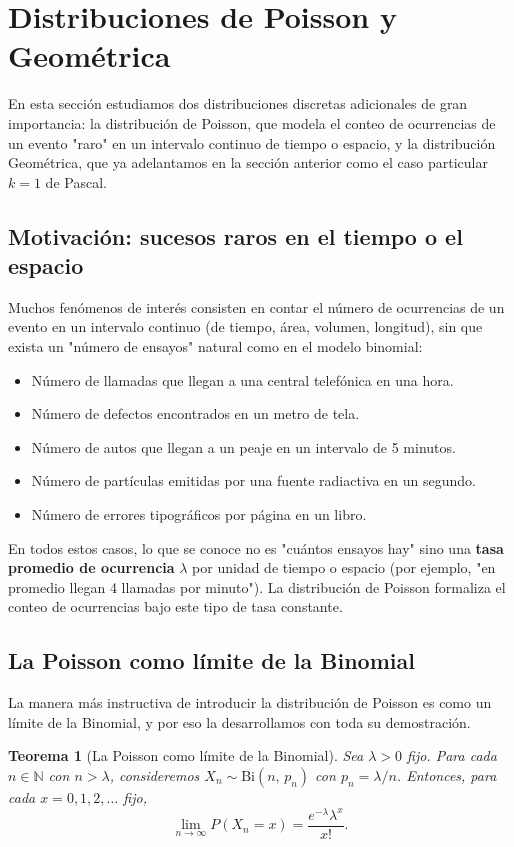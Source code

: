 \documentclass[11pt,a4paper]{article}
\theoremstyle{plain}
\newtheorem{teorema}{Teorema}[section]
\theoremstyle{definition}
\theoremstyle{remark}
\begin{document}
\newpage
\section{Distribuciones de Poisson y Geométrica}

En esta sección estudiamos dos distribuciones discretas adicionales de gran importancia: la distribución de Poisson, que modela el conteo de ocurrencias de un evento "raro" en un intervalo continuo de tiempo o espacio, y la distribución Geométrica, que ya adelantamos en la sección anterior como el caso particular $k=1$ de Pascal.

\subsection{Motivación: sucesos raros en el tiempo o el espacio}

Muchos fenómenos de interés consisten en contar el número de ocurrencias de un evento en un intervalo continuo (de tiempo, área, volumen, longitud), sin que exista un "número de ensayos" natural como en el modelo binomial:
\begin{itemize}
\item Número de llamadas que llegan a una central telefónica en una hora.
\item Número de defectos encontrados en un metro de tela.
\item Número de autos que llegan a un peaje en un intervalo de 5 minutos.
\item Número de partículas emitidas por una fuente radiactiva en un segundo.
\item Número de errores tipográficos por página en un libro.
\end{itemize}
En todos estos casos, lo que se conoce no es "cuántos ensayos hay" sino una \textbf{tasa promedio de ocurrencia} $\lambda$ por unidad de tiempo o espacio (por ejemplo, "en promedio llegan 4 llamadas por minuto"). La distribución de Poisson formaliza el conteo de ocurrencias bajo este tipo de tasa constante.

\subsection{La Poisson como límite de la Binomial}

La manera más instructiva de introducir la distribución de Poisson es como un límite de la Binomial, y por eso la desarrollamos con toda su demostración.

\begin{teorema}[La Poisson como límite de la Binomial]\label{thm:poissonlimite}
Sea $\lambda>0$ fijo. Para cada $n\in\mathbb{N}$ con $n>\lambda$, consideremos $X_n\sim\text{Bi}(n,\,p_n)$ con $p_n=\lambda/n$. Entonces, para cada $x=0,1,2,\dots$ fijo,
$$\lim_{n\to\infty}P(X_n=x)=\frac{e^{-\lambda}\lambda^x}{x!}.$$
\end{teorema}
\end{document}
